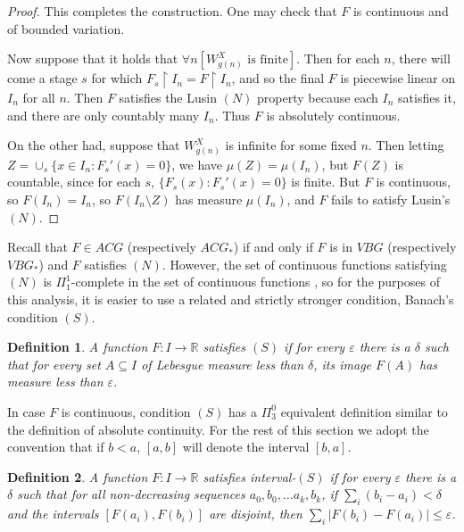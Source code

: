 \documentclass[12pt]{amsart}
\newtheorem{definition}{Definition}
\newcommand{\uhr}{\upharpoonright}
\newcommand{\eps}{\varepsilon}
\begin{document}
\begin{proof}
This completes the construction. One may check that $F$ is continuous and of bounded variation.

Now suppose that it holds that $\forall n [W_{g(n)}^X \text{ is finite}]$.  Then for each $n$, there will come a stage $s$ for which $F_s\uhr I_n = F\uhr I_n$, and so the final $F$ is piecewise linear on $I_n$ for all $n$.  Then $F$ satisfies the Lusin $(N)$ property because each $I_n$ satisfies it, and there are only countably many $I_n$.  Thus $F$ is absolutely continuous.

On the other had, suppose that $W_{g(n)}^X$ is infinite for some fixed $n$.  Then letting $Z = \cup_s \{x \in I_n: F_s'(x) = 0\}$, we have $\mu(Z) = \mu(I_n)$, but $F(Z)$ is countable, since for each $s$, $\{F_s(x) : F_s'(x) = 0\}$ is finite.  But $F$ is continuous, so $F(I_n)= I_n$, so $F(I_n\setminus Z)$ has measure $\mu(I_n)$, and $F$ fails to satisfy Lusin's $(N)$.
\end{proof}

Recall that $F \in ACG$ (respectively $ACG_\ast$) if and only if 
$F$ is in $VBG$ (respectively $VBG_\ast$) and $F$ satisfies $(N)$.
{However, the set of continuous functions satisfying 
$(N)$ is $\Pi^1_1$-complete in the set of continuous functions 
\cite{HPZZ1998},}
so for the purposes of this analysis, it is easier to use a
related and strictly stronger condition, Banach's condition $(S)$.

\begin{definition}
A function $F:I \rightarrow \mathbb R$ satisfies $(S)$ if for every 
$\eps$ there is a $\delta$ such that for every set $A \subseteq I$ 
of Lebesgue measure less than $\delta$, its image $F(A)$ has 
measure less than $\eps$.
\end{definition}

In case $F$ is continuous, condition $(S)$ has a $\Pi^0_3$ equivalent 
definition similar to the definition of absolute continuity. 
For the rest of this section we adopt the convention that if $b<a$, 
$[a,b]$ will denote the interval $[b,a]$.

\begin{definition}
A function $F:I\rightarrow\mathbb R$ satisfies \emph{interval-$(S)$} if 
for every 
$\eps$ there is a $\delta$ such that for all non-decreasing sequences 
$a_0,b_0,\dots a_k, b_k$, if $\sum_i (b_i - a_i) < \delta$ and 
the intervals $[F(a_i),F(b_i)]$ are disjoint, then 
$\sum_i |F(b_i) - F(a_i)| \leq \eps$.
\end{definition}
\end{document}

